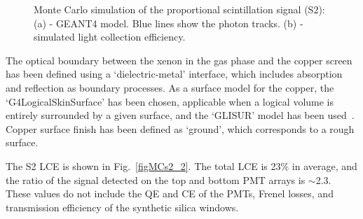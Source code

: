 \begin{figure}[!b]
\centering
{}
\caption[Monte Carlo simulation of the proportional scintillation signal (S2)]{Monte Carlo simulation of the proportional scintillation signal (S2): (a) - GEANT4 model. Blue lines show the photon tracks. (b) - simulated light collection efficiency.}
\label{figMCs2}
\end{figure}

The optical boundary between the xenon in the gas phase and the copper screen has been defined using a  `dielectric-metal' interface, which includes absorption and reflection as boundary processes. As a surface model for the copper, the `G4LogicalSkinSurface' has been chosen, applicable when a logical volume is entirely surrounded by a given surface, and the `GLISUR' model has been used~\cite{LogicalSkinSurface}. Copper surface finish has been defined as `ground', which corresponds to a rough surface.

The S2 LCE is shown in Fig.~\ref{figMCs2_2}. The total LCE is 23\% in average, and the ratio of the signal detected on the top and bottom PMT arrays is $\sim$2.3. These values do not include the QE and CE of the PMTs, Frenel losses, and transmission efficiency of the synthetic silica windows.

